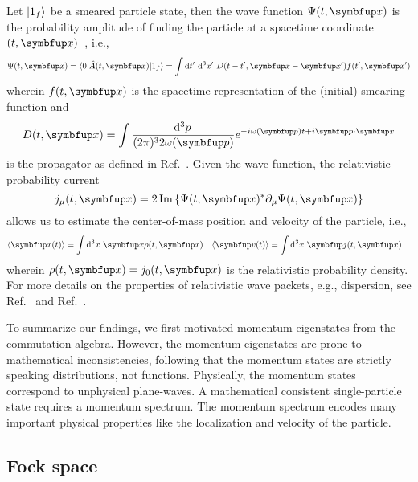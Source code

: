 Let $\lvert1_f\rangle$ be a smeared particle state, then the wave function $\Psi(t,\vb{x})$ is the probability amplitude of finding the particle at a spacetime coordinate $(t,\vb{x})$~\cite[p.~24]{Peskin1995}, i.e.,
\begin{equation}
	\Psi(t,\vb{x})
	=
	\bra{0}
	\hat{A}(t,\vb{x})
	\ket{1_f}
	=
	\int\dd{t^\prime}\dd[3]{x^\prime}
	D(t-t^\prime,\vb{x}-\vb{x}^\prime)
	f(t^\prime,\vb{x}^\prime)
\end{equation}
wherein $f(t,\vb{x})$ is the spacetime representation of the (initial) smearing function and
\begin{equation}
	D(t,\vb{x})
	=
	\int\frac{\dd[3]{p}}{(2\pi)^32\omega(\vb{p})}
	e^{-i\omega(\vb{p})t+i\vb{p}\vdot\vb{x}}
\end{equation}
is the propagator as defined in Ref.~\cite[p.~27]{Peskin1995}.
Given the wave function, the relativistic probability current
\begin{equation}
	j_\mu(t,\vb{x})
	=
	2\Im\left\{
		\Psi(t,\vb{x})^*
		\partial_\mu
		\Psi(t,\vb{x})
	\right\}
\end{equation}
allows us to estimate the center-of-mass position and velocity of the particle, i.e.,
\begin{align}
	\expval{\vb{x}(t)}
	&=
	\int\dd[3]{x}
	\vb{x}
	\rho(t,\vb{x})
	&
	\expval{\vb{v}(t)}
	&=
	\int\dd[3]{x}
	\vb{j}(t,\vb{x})
\end{align}
wherein $\rho(t,\vb{x})=j_0(t,\vb{x})$ is the relativistic probability density.
For more details on the properties of relativistic wave packets, e.g., dispersion, see Ref.~\cite{Naumov2013} and Ref.~\cite{Naumov2009}.

To summarize our findings, we first motivated momentum eigenstates from the commutation algebra.
However, the momentum eigenstates are prone to mathematical inconsistencies, following that the momentum states are strictly speaking distributions, not functions.
Physically, the momentum states correspond to unphysical plane-waves.
A mathematical consistent single-particle state requires a momentum spectrum.
The momentum spectrum encodes many important physical properties like the localization and velocity of the particle.

\subsection{Fock space}

